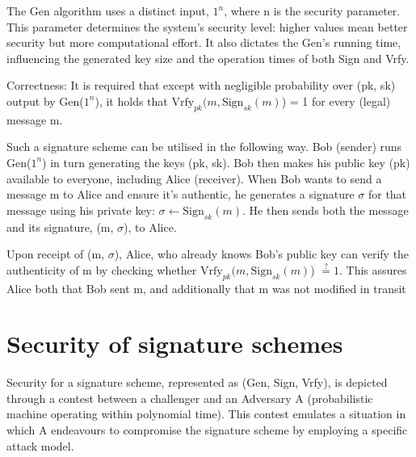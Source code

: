 \documentclass[]{final_report}
\theoremstyle{definition}
\begin{document}
The Gen algorithm uses a distinct input, $1^n$, where n is the security parameter. This parameter determines the system's security level: higher values mean better security but more computational effort. It also dictates the Gen's running time, influencing the generated key size and the operation times of both Sign and Vrfy.



Correctness: It is required that except with negligible probability over (pk, sk) output by Gen($1^n$), it holds that $\text{Vrfy}_{pk} (m, \text{Sign}_{sk}(m)$) = 1 for every (legal) message m. 

Such a signature scheme can be utilised in the following way.
Bob (sender) runs Gen($1^n$) in turn generating the keys (pk, sk). Bob then makes his public key (pk) available to everyone, including Alice (receiver). 
When Bob wants to send a message m to Alice and ensure it's authentic, he generates a signature $\sigma$ for that message using his private key: $\sigma \leftarrow \text{Sign}_{sk}(m)$. He then sends both the message and its signature, (m, $\sigma$), to Alice.

Upon receipt of (m, $\sigma$), Alice, who already knows Bob's public key can verify the authenticity of m by checking whether $\text{Vrfy}_{pk} (m, \text{Sign}_{sk}(m)$) $\stackrel{?}{=} 1$. This assures Alice both that Bob sent m, and additionally that m was not modified in transit

\section{Security of signature schemes}
Security for a signature scheme, represented as (Gen, Sign, Vrfy), is depicted through a contest between a challenger and an Adversary A (probabilistic machine operating within polynomial time). This contest emulates a situation in which A endeavours to compromise the signature scheme by employing a specific attack model. 
\end{document}

